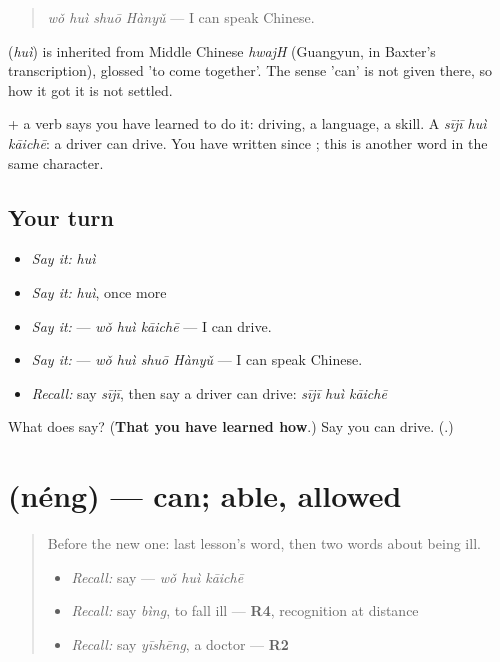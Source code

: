 \begin{quote}
\textbf{} \emph{wǒ huì shuō Hànyǔ} — I can speak Chinese.
\end{quote}

\begin{cousinweb}
\textbf{} (\emph{huì}) is inherited from Middle Chinese \emph{hwajH} (Guangyun, in Baxter's transcription), glossed 'to come together'. The sense 'can' is not given there, so how it got it is not settled.
\end{cousinweb}

\begin{grammarlens}[title={What you've built}]
 + a verb says you have learned to do it: driving, a language, a skill. A \emph{sījī huì kāichē}: a driver can drive. You have written  since ; this is another word in the same character.
\end{grammarlens}

\subsection*{Your turn}
\begin{itemize}
\raggedright
  \item \emph{Say it:} \emph{huì}
  \item \emph{Say it:} \emph{huì}, once more
  \item \emph{Say it:}  — \emph{wǒ huì kāichē} — I can drive.
  \item \emph{Say it:}  — \emph{wǒ huì shuō Hànyǔ} — I can speak Chinese.
  \item \emph{Recall:} say \emph{sījī}, then say a driver can drive: \emph{sījī huì kāichē}
\end{itemize}

\begin{tcolorbox}[breakable,colback=teal!4,colframe=teal!35!black,title={Before you move on}]
What does  say? (\textbf{That you have learned how}.) Say you can drive. (\textbf{}.)
\end{tcolorbox}
\section[\texorpdfstring{\zh{能} (néng)}{能 (néng)}]{ (néng) — can; able, allowed}

\label{lesson:ZH-C90-neng}



\begin{quote}
Before the new one: last lesson's word, then two words about being ill.

\begin{itemize}
\raggedright
  \item \emph{Recall:} say  — \emph{wǒ huì kāichē}
  \item \emph{Recall:} say \emph{bìng}, to fall ill — \textbf{R4}, recognition at distance
  \item \emph{Recall:} say \emph{yīshēng}, a doctor — \textbf{R2}
\end{itemize}
\end{quote}

